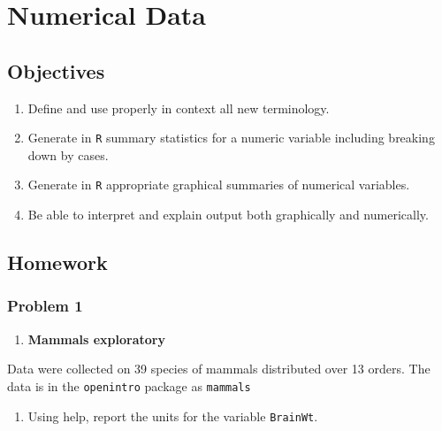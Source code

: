 \documentclass[
]{book}
\providecommand{\tightlist}{%
  \setlength{\itemsep}{0pt}\setlength{\parskip}{0pt}}
\begin{document}
\hypertarget{NUMDATA}{%
\chapter{Numerical Data}\label{NUMDATA}}

\hypertarget{objectives-4}{%
\section{Objectives}\label{objectives-4}}

\begin{enumerate}
\def\labelenumi{\arabic{enumi})}
\tightlist
\item
  Define and use properly in context all new terminology.\\
\item
  Generate in \texttt{R} summary statistics for a numeric variable including breaking down by cases.\\
\item
  Generate in \texttt{R} appropriate graphical summaries of numerical variables.\\
\item
  Be able to interpret and explain output both graphically and numerically.
\end{enumerate}

\hypertarget{homework-4}{%
\section{Homework}\label{homework-4}}

\hypertarget{problem-1-4}{%
\subsection{Problem 1}\label{problem-1-4}}

\begin{enumerate}
\def\labelenumi{\arabic{enumi}.}
\tightlist
\item
  \textbf{Mammals exploratory}
\end{enumerate}

Data were collected on 39 species of mammals distributed over 13 orders. The data is in the \texttt{openintro} package as \texttt{mammals}

\begin{enumerate}
\def\labelenumi{\alph{enumi}.}
\tightlist
\item
  Using help, report the units for the variable \texttt{BrainWt}.
\end{enumerate}
\end{document}
